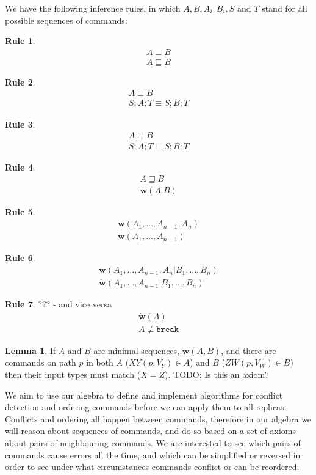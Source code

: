 \documentclass[12pt]{article}
\newcommand{\cbrk}{\mathtt{break}}
\newcommand{\fscommand}[2]{{#1#2}}
\newcommand{\cxy}{\fscommand{X}{Y}}
\newcommand{\czw}{\fscommand{Z}{W}}
\newcommand{\eqext}{\sqsubseteq}
\newcommand{\eqnrw}{\sqsupseteq}
\newcommand{\nequiv}{\not\equiv}
\newcommand{\works}[1]{\dot{\mathbf{w}}({#1})}
\newcommand{\worksc}[2]{\dot{\mathbf{w}}({#1}|{#2})}
\newcommand{\infer}[2]{\begin{array}{c}{#1}\\\hline{#2}\end{array}}
\theoremstyle{definition}
\newtheorem{mylem}{Lemma}
\newtheorem{myrul}{Rule}
\begin{document}
We have the following inference rules, in which $A,B,A_i,B_i,S$ and $T$ stand for all possible sequences of commands:


\begin{myrul}
\[\infer{A\equiv B}{A\eqext B}\]
\end{myrul}

\begin{myrul}
\[\infer{A\equiv B}{S;A;T\equiv S;B;T}\]
\end{myrul}

\begin{myrul}
\[\infer{A\eqext B}{S;A;T\eqext S;B;T}\]
\end{myrul}

\begin{myrul}
\[\infer{A\eqnrw B}{\worksc{A}{B}}\]
\end{myrul}

\begin{myrul}
\[\infer{\works{A_1,\ldots,A_{n-1},A_n}}{\works{A_1,\ldots,A_{n-1}}}\]
\end{myrul}

\begin{myrul}
\[\infer{\worksc{A_1,\ldots,A_{n-1},A_n}{B_1,\ldots,B_n}}{\worksc{A_1,\ldots,A_{n-1}}{B_1,\ldots,B_n}}\]
\end{myrul}

\begin{myrul}{??? - and vice versa}
\[\infer{\works{A}}{A\nequiv\cbrk}\]
\end{myrul}

\begin{mylem}\label{worksinputmatch}
If $A$ and $B$ are minimal sequences, $\works{A,B}$,
and there are commands on path $p$ in both $A$ ($\cxy(p, V_Y)\in A$) and $B$ ($\czw(p, V_W)\in B$)
then their input types must match ($X=Z$).
TODO: Is this an axiom?
\end{mylem}


We aim to use our algebra to define and implement algorithms for conflict detection
and ordering commands before we can apply them to all replicas.
Conflicts and ordering all happen between commands, therefore in our algebra
we will reason about sequences of commands, 
and do so based on a set of axioms about pairs of neighbouring commands.
We are interested to see which pairs of commands cause errors all the time,
and which can be simplified or reversed
in order to see under what circumstances commands conflict or can be reordered.
\end{document}
